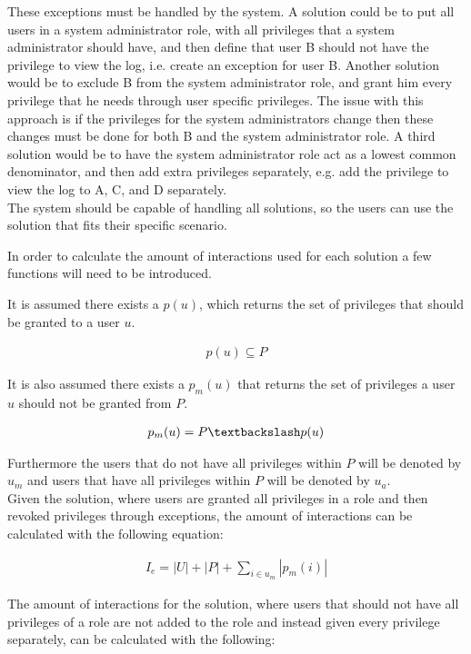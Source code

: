 These exceptions must be handled by the system. A solution could be to put all users in a system administrator role, with all privileges that a system administrator should have, and then define that user B should not have the privilege to view the log, i.e. create an exception for user B. Another solution would be to exclude B from the system administrator role, and grant him every privilege that he needs through user specific privileges. The issue with this approach is if the privileges for the system administrators change then these changes must be done for both B and the system administrator role. A third solution would be to have the system administrator role act as a lowest common denominator, and then add extra privileges separately, e.g. add the privilege to view the log to A, C, and D separately. \\

The system should be capable of handling all solutions, so the users can use the solution that fits their specific scenario.

In order to calculate the amount of interactions used for each solution a few functions will need to be introduced.

It is assumed there exists a $p(u)$, which returns the set of privileges that should be granted to a user $u$.

\begin{align}
p(u) \subseteq P
\end{align}

It is also assumed there exists a $p_{m}(u)$ that returns the set of privileges a user $u$ should not be granted from $P$.

\begin{align}
p_{m}(u)=P\textbackslash p(u)
\end{align}

Furthermore the users that do not have all privileges within $P$ will be denoted by $u_{m}$ and users that have all privileges within $P$ will be denoted by $u_{a}$. \\

Given the solution, where users are granted all privileges in a role and then revoked privileges through exceptions, the amount of interactions can be calculated with the following equation:

\begin{align}
I_{e} = |U| + |P| + \sum_{i \in u_{m}} |p_{m}(i)|
\end{align}

The amount of interactions for the solution, where users that should not have all privileges of a role are not added to the role and instead given every privilege separately, can be calculated with the following:

